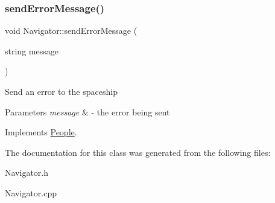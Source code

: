 \subsubsection{\texorpdfstring{send\+Error\+Message()}{sendErrorMessage()}}
{\footnotesize\ttfamily void Navigator\+::send\+Error\+Message (\begin{DoxyParamCaption}\item[{string}]{message }\end{DoxyParamCaption})\hspace{0.3cm}{\ttfamily [virtual]}}

Send an error to the spaceship 
\begin{DoxyParams}{Parameters}
{\em message} & -\/ the error being sent \\
\hline
\end{DoxyParams}


Implements \hyperlink{classPeople_a572a35170f61d1848eb04b65baafb057}{People}.



The documentation for this class was generated from the following files\+:\begin{DoxyCompactItemize}
\item 
Navigator.\+h\item 
Navigator.\+cpp\end{DoxyCompactItemize}
